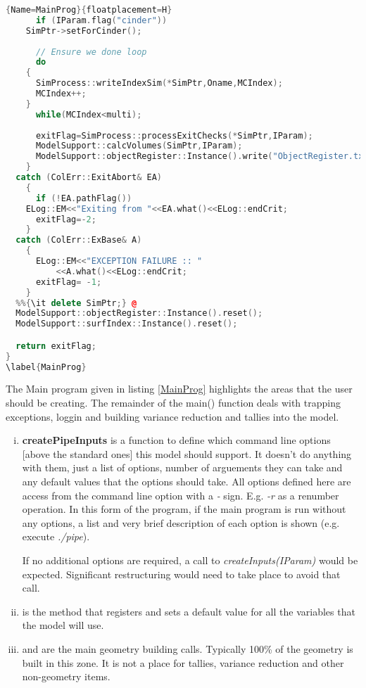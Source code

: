 \begin{lstlisting}[language=C++]{Name=MainProg}{floatplacement=H}
      if (IParam.flag("cinder"))
	SimPtr->setForCinder();
            
      // Ensure we done loop
      do
	{
	  SimProcess::writeIndexSim(*SimPtr,Oname,MCIndex);
	  MCIndex++;
	}
      while(MCIndex<multi);
      
      exitFlag=SimProcess::processExitChecks(*SimPtr,IParam);
      ModelSupport::calcVolumes(SimPtr,IParam);
      ModelSupport::objectRegister::Instance().write("ObjectRegister.txt");
    }
  catch (ColErr::ExitAbort& EA)
    {
      if (!EA.pathFlag())
	ELog::EM<<"Exiting from "<<EA.what()<<ELog::endCrit;
      exitFlag=-2;
    }
  catch (ColErr::ExBase& A)
    {
      ELog::EM<<"EXCEPTION FAILURE :: "
	      <<A.what()<<ELog::endCrit;
      exitFlag= -1;
    }
  %%{\it delete SimPtr;} @
  ModelSupport::objectRegister::Instance().reset();
  ModelSupport::surfIndex::Instance().reset();

  return exitFlag;
}
\label{MainProg}
\end{lstlisting}

The Main program given in listing \ref{MainProg} highlights the areas
that the user should be creating. The remainder of the main() function
deals with trapping exceptions, loggin and building variance reduction
and tallies into the model.

\begin{enumerate}[(i)]
\item {\bf createPipeInputs} is a 
function to define which command line options [above the standard ones]
this model should support. It doesn't do anything with them, just a
list of options, number of arguements they can take and any default
values that the options should take. All options defined here are
access from the command line option with a {\it -} sign. E.g. {\it -r} as a
renumber operation. In this form of the program, if the main program
is run without any options, a list and very brief description of each
option is shown (e.g. execute {\it ./pipe}).

If no additional options are required, a call to
{\it createInputs(IParam)} would be expected. Significant restructuring
would need to take place to avoid that call.
\item {} is the method that registers
and sets a default value for all the variables that the model will
use. 
\item {} and  are the
main geometry building calls. Typically 100\% of the geometry is built
in this zone. It is not a place for tallies, variance reduction and other
non-geometry items.
\end{enumerate}



